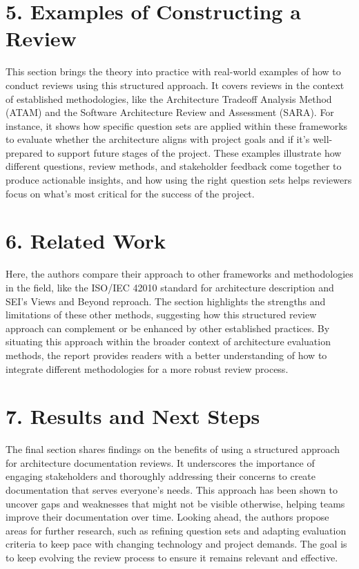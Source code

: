\documentclass{article}
\begin{document}
\section*{5. Examples of Constructing a Review}
This section brings the theory into practice with real-world examples of how to conduct reviews using this structured approach. It covers reviews in the context of established methodologies, like the Architecture Tradeoff Analysis Method (ATAM) and the Software Architecture Review and Assessment (SARA). For instance, it shows how specific question sets are applied within these frameworks to evaluate whether the architecture aligns with project goals and if it’s well-prepared to support future stages of the project. These examples illustrate how different questions, review methods, and stakeholder feedback come together to produce actionable insights, and how using the right question sets helps reviewers focus on what’s most critical for the success of the project.

\section*{6. Related Work}
Here, the authors compare their approach to other frameworks and methodologies in the field, like the ISO/IEC 42010 standard for architecture description and SEI's Views and Beyond reproach. The section highlights the strengths and limitations of these other methods, suggesting how this structured review approach can complement or be enhanced by other established practices. By situating this approach within the broader context of architecture evaluation methods, the report provides readers with a better understanding of how to integrate different methodologies for a more robust review process.

\section*{7. Results and Next Steps}
The final section shares findings on the benefits of using a structured approach for architecture documentation reviews. It underscores the importance of engaging stakeholders and thoroughly addressing their concerns to create documentation that serves everyone’s needs. This approach has been shown to uncover gaps and weaknesses that might not be visible otherwise, helping teams improve their documentation over time. Looking ahead, the authors propose areas for further research, such as refining question sets and adapting evaluation criteria to keep pace with changing technology and project demands. The goal is to keep evolving the review process to ensure it remains relevant and effective.
\end{document}

